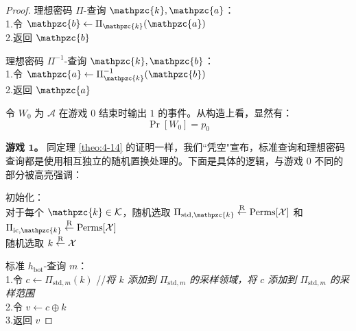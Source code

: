 \begin{proof}
\hspace*{5pt} 理想密码 $\Pi$-查询 $\mathpzc{k},\mathpzc{a}$：\\
\hspace*{26pt} 1.\qquad 令 $\mathpzc{b}\leftarrow\Pi_\mathpzc{k}(\mathpzc{a})$\\
\hspace*{26pt} 2.\qquad 返回 $\mathpzc{b}$

\vspace{5pt}

\hspace*{5pt} 理想密码 $\Pi^{-1}$-查询 $\mathpzc{k},\mathpzc{b}$：\\
\hspace*{26pt} 1.\qquad 令 $\mathpzc{a}\leftarrow\Pi_\mathpzc{k}^{-1}(\mathpzc{b})$\\
\hspace*{26pt} 2.\qquad 返回 $\mathpzc{a}$

\vspace{5pt}

令 $W_0$ 为 $\mathcal{A}$ 在游戏 $0$ 结束时输出 $1$ 的事件。从构造上看，显然有：
\begin{equation}\label{eq:8-8}
\Pr[W_0]=p_0
\end{equation}

\noindent\textbf{游戏 $\mathbf{1}$。}
同定理 \ref{theo:4-14} 的证明一样，我们``凭空"宣布，标准查询和理想密码查询都是使用相互独立的随机置换处理的。下面是具体的逻辑，与游戏 $0$ 不同的部分被高亮强调：

\vspace{5pt}

\hspace*{5pt} 初始化：\\
\hspace*{50pt} 对于每个 $\mathpzc{k}\in\mathcal{K}$，随机选取 \colorbox{gray!50}{$\Pi_{\mathrm{std},\mathpzc{k}}\overset{\rm R}\leftarrow\mathrm{Perms}[\mathcal{X}]$ 和 $\Pi_{\mathrm{ic},\mathpzc{k}}\overset{\rm R}\leftarrow\mathrm{Perms}[\mathcal{X}]$}\\
\hspace*{50pt} 随机选取 $k\overset{\rm R}\leftarrow\mathcal{X}$

\vspace{5pt}

\hspace*{5pt} 标准 $h_\mathrm{bot}$-查询 $m$：\\
\hspace*{26pt} 1.\qquad 令 $c\leftarrow$\colorbox{gray!50}{$\Pi_{\mathrm{std},m}(k)$}
\quad//\quad\emph{将 $k$ 添加到 $\Pi_{\mathrm{std},m}$ 的采样领域，将 $c$ 添加到 $\Pi_{\mathrm{std},m}$ 的采样范围}\\
\hspace*{26pt} 2.\qquad 令 $v\leftarrow c\oplus k$\\
\hspace*{26pt} 3.\qquad 返回 $v$


\end{proof}
